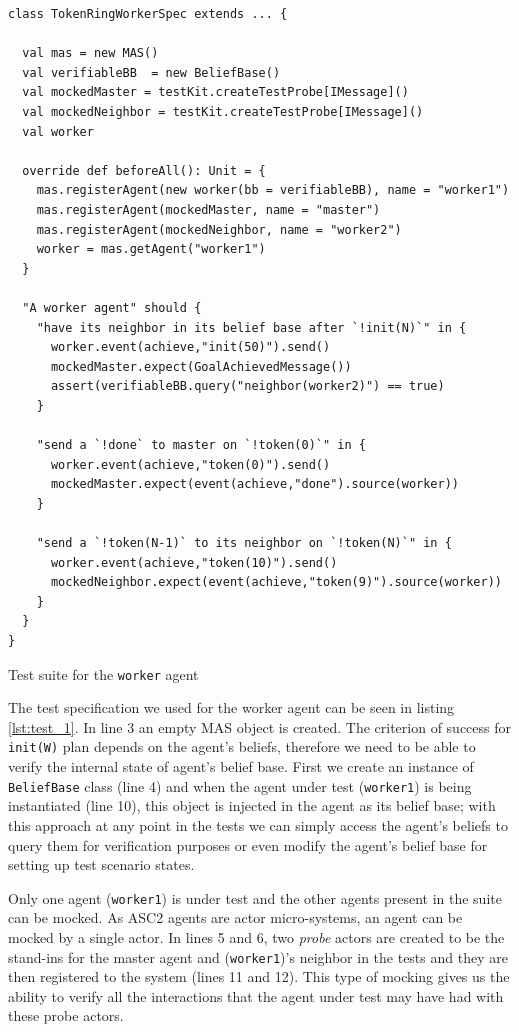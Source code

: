\begin{listing}[!tb]
\centering
\begin{verbatim}
class TokenRingWorkerSpec extends ... {

  val mas = new MAS()
  val verifiableBB  = new BeliefBase()
  val mockedMaster = testKit.createTestProbe[IMessage]()
  val mockedNeighbor = testKit.createTestProbe[IMessage]()
  val worker

  override def beforeAll(): Unit = {
    mas.registerAgent(new worker(bb = verifiableBB), name = "worker1")
    mas.registerAgent(mockedMaster, name = "master")
    mas.registerAgent(mockedNeighbor, name = "worker2")
    worker = mas.getAgent("worker1")
  }

  "A worker agent" should {
    "have its neighbor in its belief base after `!init(N)`" in {
      worker.event(achieve,"init(50)").send()
      mockedMaster.expect(GoalAchievedMessage())
      assert(verifiableBB.query("neighbor(worker2)") == true)
    }

    "send a `!done` to master on `!token(0)`" in {
      worker.event(achieve,"token(0)").send()
      mockedMaster.expect(event(achieve,"done").source(worker))
    }

    "send a `!token(N-1)` to its neighbor on `!token(N)`" in {
      worker.event(achieve,"token(10)").send()
      mockedNeighbor.expect(event(achieve,"token(9)").source(worker))
    }
  }
}
\end{verbatim}
\vspace{-5pt}
    \caption{Test suite for the \texttt{worker} agent}
    \label{lst:test_1}
\vspace{-5pt}
\end{listing}

The test specification we used for the worker agent can be seen in listing \ref{lst:test_1}. In line 3 an empty MAS object is created. The criterion of success for \texttt{init(W)} plan depends on the agent's beliefs, therefore we need to be able to verify the internal state of agent's belief base. First we create an instance of \texttt{BeliefBase} class (line 4) and when the agent under test (\texttt{worker1}) is being instantiated (line 10), this object is injected in the agent as its belief base; with this approach at any point in the tests we can simply access the agent's beliefs to query them for verification purposes or even modify the agent's belief base for setting up test scenario states.

Only one agent (\texttt{worker1}) is under test and the other agents present in the suite can be mocked. As ASC2 agents are actor micro-systems, an agent can be mocked by a single actor. In lines 5 and 6, two \textit{probe} actors are created to be the stand-ins for the master agent and (\texttt{worker1})'s neighbor in the tests and they are then registered to the system (lines 11 and 12). This type of mocking gives us the ability to verify all the interactions that the agent under test may have had with these probe actors.

